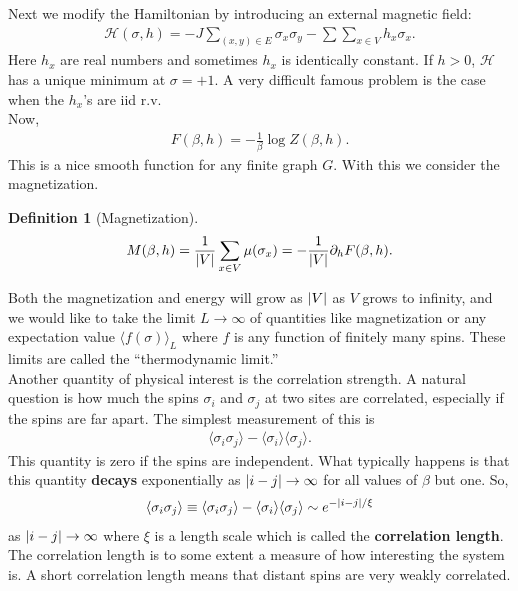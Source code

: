 \documentclass{book}
\theoremstyle{definition}
\newtheorem{defn}{Definition}[section]
\newcommand{\p}{\partial}
\newcommand{\had}{\mathcal{H}}
\newcommand{\f}[2]{\frac{#1}{#2}}
\newcommand{\la}{\langle}
\newcommand{\ra}{\rangle}
\begin{document}
Next we modify the Hamiltonian by introducing an external magnetic field:
\begin{align}
\had(\sigma, h) = -J \sum_{(x,y)\in E} \sigma_x \sigma_y - \sum \sum_{x\in V} h_x \sigma_x.
\end{align}
Here $h_x$ are real numbers and sometimes $h_x$ is identically constant. If $h> 0$, $\had$ has a unique minimum at $\sigma = +1$. A very difficult famous problem is the case when the $h_x$'s are iid r.v. \\

Now, 
\begin{align}
F(\beta,h) = -\f{1}{\beta} \log Z(\beta,h).
\end{align}
This is a nice smooth function for any finite graph $G$. With this we consider the magnetization. 

\begin{defn}[Magnetization]
	\begin{align}
	M(\beta, h) = \f{1}{\abs{V}} \sum_{x\in V}\mu(\sigma_x) = -\f{1}{\abs{V}} \p_h F(\beta,h).
	\end{align}
\end{defn}



Both the magnetization and energy will grow as $\abs{V}$ as $V$ grows to infinity, and we would like to take the limit $L\to \infty$ of quantities like magnetization or any expectation value $\langle f(\sigma) \rangle_L$ where $f$ is any function of finitely many spins. These limits are called the ``thermodynamic limit.'' \\

Another quantity of physical interest is the correlation strength. A natural question is how much the spins $\sigma_i$ and $\sigma_j$ at two sites are correlated, especially if the spins are far apart. The simplest measurement of this is
\begin{align}
\langle \sigma_i \sigma_j \rangle - \la \sigma_i \ra \la \sigma_j \ra. 
\end{align}
This quantity is zero if the spins are independent. What typically happens is that this quantity \textbf{decays} exponentially as $\abs{i-j}\to \infty$ for all values of $\beta$ but one. So, 
\begin{align}
\la \sigma_i \sigma_j \ra \equiv \langle \sigma_i \sigma_j \rangle - \la \sigma_i \ra \la \sigma_j \ra \sim e^{-\abs{i-j}/\xi}
\end{align}
as $\abs{i-j}\to \infty$ where $\xi$ is a length scale which is called the \textbf{correlation length}. The correlation length is to some extent a measure of how interesting the system is. A short correlation length means that distant spins are very weakly correlated.\\
\end{document}
